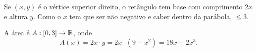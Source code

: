 Se $(x,y)$ é o vértice superior direito, o retângulo tem base com comprimento $2x$ e altura $y$.
Como o $x$ tem que ser não negativo e caber dentro da parábola, $\leq 3$.

A área é $A:[0,3]\rightarrow\mathbb{R}$, onde
\[
	A(x)=2x\cdot y=2x\cdot(9-x^2)=18x-2x^3.
\]
